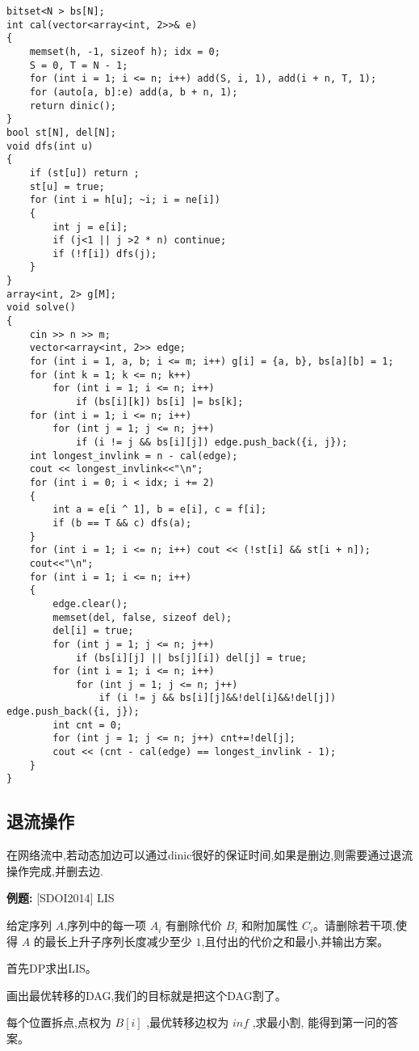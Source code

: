 \documentclass[a4paper, fontset=none]{ctexart}
\begin{document}
\begin{verbatim}
bitset<N > bs[N];
int cal(vector<array<int, 2>>& e)
{
    memset(h, -1, sizeof h); idx = 0;
    S = 0, T = N - 1;
    for (int i = 1; i <= n; i++) add(S, i, 1), add(i + n, T, 1);
    for (auto[a, b]:e) add(a, b + n, 1);
    return dinic();
}
bool st[N], del[N];
void dfs(int u)
{
    if (st[u]) return ;
    st[u] = true;
    for (int i = h[u]; ~i; i = ne[i])
    {
        int j = e[i];
        if (j<1 || j >2 * n) continue;
        if (!f[i]) dfs(j);
    }
}
array<int, 2> g[M];
void solve()
{
    cin >> n >> m;
    vector<array<int, 2>> edge;
    for (int i = 1, a, b; i <= m; i++) g[i] = {a, b}, bs[a][b] = 1;
    for (int k = 1; k <= n; k++)
        for (int i = 1; i <= n; i++)
            if (bs[i][k]) bs[i] |= bs[k];
    for (int i = 1; i <= n; i++)
        for (int j = 1; j <= n; j++)
            if (i != j && bs[i][j]) edge.push_back({i, j});
    int longest_invlink = n - cal(edge);
    cout << longest_invlink<<"\n";
    for (int i = 0; i < idx; i += 2)
    {
        int a = e[i ^ 1], b = e[i], c = f[i];
        if (b == T && c) dfs(a);
    }
    for (int i = 1; i <= n; i++) cout << (!st[i] && st[i + n]);
    cout<<"\n";
    for (int i = 1; i <= n; i++)
    {
        edge.clear();
        memset(del, false, sizeof del);
        del[i] = true;
        for (int j = 1; j <= n; j++)
            if (bs[i][j] || bs[j][i]) del[j] = true;
        for (int i = 1; i <= n; i++)
            for (int j = 1; j <= n; j++)
                if (i != j && bs[i][j]&&!del[i]&&!del[j]) edge.push_back({i, j});
        int cnt = 0;
        for (int j = 1; j <= n; j++) cnt+=!del[j];
        cout << (cnt - cal(edge) == longest_invlink - 1);
    }
}
\end{verbatim}
\subsection{退流操作}

在网络流中,若动态加边可以通过dinic很好的保证时间,如果是删边,则需要通过退流操作完成,并删去边.

\textbf{例题:}
[SDOI2014] LIS

给定序列 $A$,序列中的每一项 $A_i$ 有删除代价 $B_i$ 和附加属性 $C_i$。请删除若干项,使得 $A$ 的最长上升子序列长度减少至少 $1$,且付出的代价之和最小,并输出方案。

首先DP求出LIS。

画出最优转移的DAG,我们的目标就是把这个DAG割了。

每个位置拆点,点权为 $B[i]$ ,最优转移边权为 $inf$ ,求最小割, 能得到第一问的答案。
\end{document}
